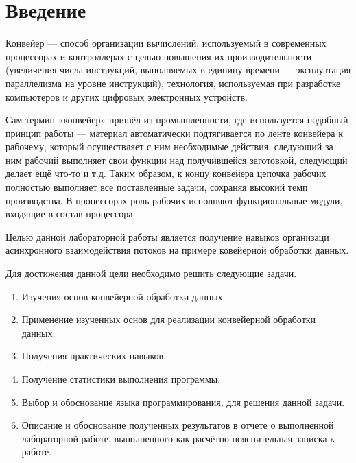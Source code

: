 \chapter*{Введение}
Конвейер — способ организации вычислений, используемый в современных процессорах и контроллерах с целью повышения их производительности (увеличения числа инструкций, выполняемых в единицу времени — эксплуатация параллелизма на уровне инструкций), технология, используемая при разработке компьютеров и других цифровых электронных устройств.

Сам термин «конвейер» пришёл из промышленности, где используется подобный принцип работы — материал автоматически подтягивается по ленте конвейера к рабочему, который осуществляет с ним необходимые действия, следующий за ним рабочий выполняет свои функции над получившейся заготовкой, следующий делает ещё что-то и т.д. Таким образом, к концу конвейера цепочка рабочих полностью выполняет все поставленные задачи, сохраняя высокий темп производства. В процессорах роль рабочих исполняют функциональные модули, входящие в состав процессора.


Целью данной лабораторной работы является получение навыков организаци асинхронного взаимодействия потоков на примере ковейерной обработки данных.


Для достижения данной цели необходимо решить следующие задачи.


\begin{enumerate}
	\item Изучения основ конвейерной обработки данных.
	\item Применение изученных основ для реализации конвейерной обработки данных.
	\item Получения практических навыков.
	\item Получение статистики выполнения программы.
	\item Выбор и обоснование языка программирования, для решения данной задачи.
	\item Описание и обоснование полученных результатов в отчете о выполненной лабораторной работе, выполненного как расчётно-пояснительная записка к работе.
\end{enumerate}
